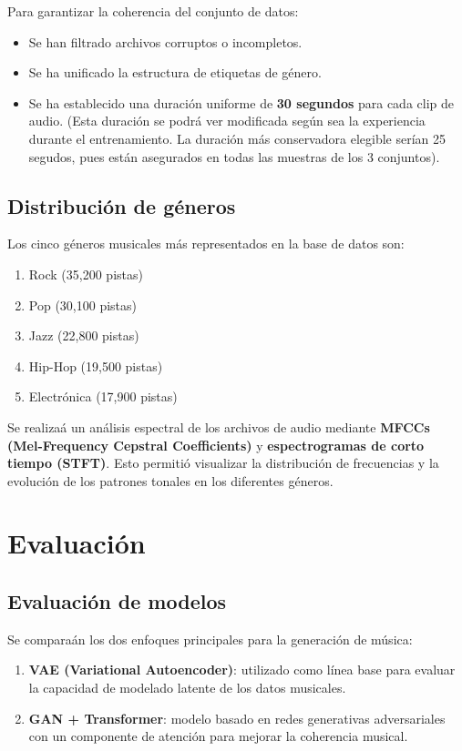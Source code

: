 Para garantizar la coherencia del conjunto de datos:
\begin{itemize}
\item Se han filtrado archivos corruptos o incompletos.
\item Se ha unificado la estructura de etiquetas de género.
\item Se ha establecido una duración uniforme de \textbf{30 segundos} para cada clip de audio. (Esta duración se podrá ver modificada según sea la experiencia durante el entrenamiento. La duración más conservadora elegible serían 25 segudos, pues están asegurados en todas las muestras de los 3 conjuntos).
\end{itemize}

\subsection{Distribución de géneros}
Los cinco géneros musicales más representados en la base de datos son:
\begin{enumerate}
\item Rock (35,200 pistas)
\item Pop (30,100 pistas)
\item Jazz (22,800 pistas)
\item Hip-Hop (19,500 pistas)
\item Electrónica (17,900 pistas)
\end{enumerate}

Se realizaá un análisis espectral de los archivos de audio mediante \textbf{MFCCs (Mel-Frequency Cepstral Coefficients)} y \textbf{espectrogramas de corto tiempo (STFT)}. Esto permitió visualizar la distribución de frecuencias y la evolución de los patrones tonales en los diferentes géneros.

\section{Evaluación}

\subsection{Evaluación de modelos}
Se comparaán los dos enfoques principales para la generación de música:
\begin{enumerate}
\item \textbf{VAE (Variational Autoencoder)}: utilizado como línea base para evaluar la capacidad de modelado latente de los datos musicales.
\item \textbf{GAN + Transformer}: modelo basado en redes generativas adversariales con un componente de atención para mejorar la coherencia musical.
\end{enumerate}


